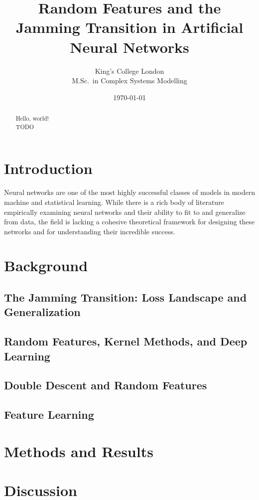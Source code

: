 \documentclass[a4paper, 12pt, titlepage]{article}
\begin{document}
\title{\bf Random Features and the Jamming Transition in Artificial Neural Networks}
\author{
    King's College London\\
    M.Sc.\ in Complex Systems Modelling
}
\date{\today}
\maketitle

\begin{abstract}
    Hello, world!\\
    TODO
\end{abstract}

\section{Introduction}
Neural networks are one of the most highly successful classes of models in modern machine and statistical learning. While there is a rich body of literature empirically examining neural networks and their ability to fit to and generalize from data, the field is lacking a cohesive theoretical framework for designing these networks and for understanding their incredible success.



\section{Background}

\subsection{The Jamming Transition: Loss Landscape and Generalization}
\cite{baity-jesiComparingDynamicsDeep2019}
\subsection{Random Features, Kernel Methods, and Deep Learning}
\subsection{Double Descent and Random Features}
\subsection{Feature Learning}

\section{Methods and Results}
\subsection{}

\section{Discussion}

\printbibliography
\end{document}
